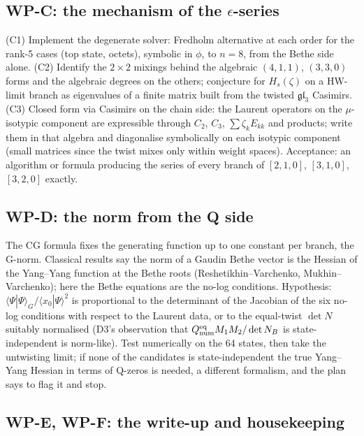 \documentclass[11pt]{article}
\begin{document}
\subsection{WP-C: the mechanism of the \texorpdfstring{$\epsilon$}{}-series}\label{sec:WPC}

(C1) Implement the degenerate solver: Fredholm alternative at each order for the rank-5 cases (top state, octets), symbolic in $\phi$, to $n=8$, from the Bethe side alone. (C2) Identify the $2\times2$ mixings behind the algebraic $(4,1,1)$, $(3,3,0)$ forms and the algebraic degrees on the others; conjecture for $H_s(\zeta)$ on a HW-limit branch as eigenvalues of a finite matrix built from the twisted $\mathfrak{gl}_3$ Casimirs. (C3) Closed form via Casimirs on the chain side: the Laurent operators on the $\mu$-isotypic component are expressible through $C_2$, $C_3$, $\sum\zeta_kE_{kk}$ and products; write them in that algebra and diagonalise symbolically on each isotypic component (small matrices since the twist mixes only within weight spaces).
Acceptance: an algorithm or formula producing the series of every branch of $[2,1,0]$, $[3,1,0]$, $[3,2,0]$ exactly.

\subsection{WP-D: the norm from the Q side}\label{sec:WPD}

The CG formula fixes the generating function up to one constant per branch, the G-norm.
Classical results say the norm of a Gaudin Bethe vector is the Hessian of the Yang--Yang function at the Bethe roots (Reshetikhin--Varchenko, Mukhin--Varchenko); here the Bethe equations are the no-log conditions.
Hypothesis: $\langle\Psi|\Psi\rangle_G/\langle x_0|\Psi\rangle^2$ is proportional to the determinant of the Jacobian of the six no-log conditions with respect to the Laurent data, or to the equal-twist $\det N$ suitably normalised (D3's observation that $Q_{\rm num}^{\rm eq}M_1M_2/\det N_B$ is state-independent is norm-like).
Test numerically on the 64 states, then take the untwisting limit; if none of the candidates is state-independent the true Yang--Yang Hessian in terms of Q-zeros is needed, a different formalism, and the plan says to flag it and stop.

\subsection{WP-E, WP-F: the write-up and housekeeping}\label{sec:WPE}
\end{document}
